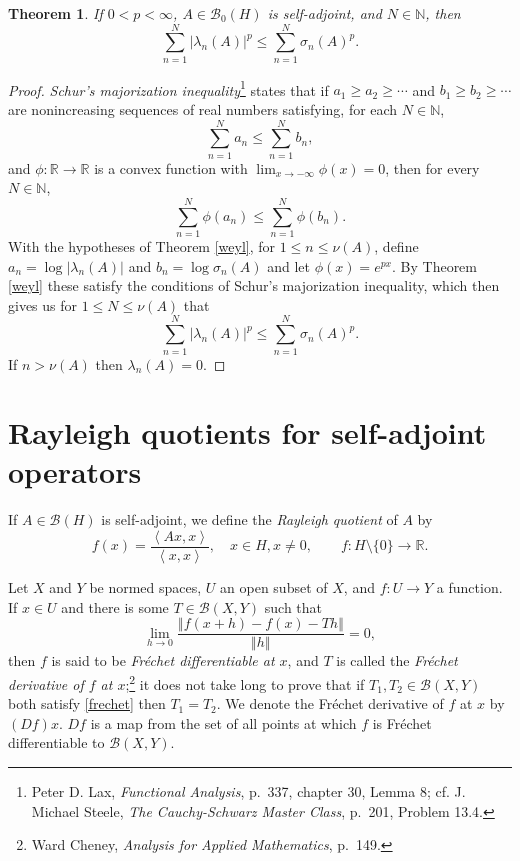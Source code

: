 \documentclass{article}
\newcommand{\inner}[2]{\left\langle #1, #2 \right\rangle}
\newcommand{\norm}[1]{\left\Vert #1 \right\Vert}
\newtheorem{theorem}{Theorem}
\theoremstyle{definition}
\begin{document}
\begin{theorem}
If $0<p<\infty$, $A \in \mathscr{B}_0(H)$ is self-adjoint, and $N \in \mathbb{N}$, then
\[
\sum_{n=1}^N |\lambda_n(A)|^p \leq \sum_{n=1}^N \sigma_n(A)^p.
\]
\end{theorem}
\begin{proof}
{\em Schur's majorization inequality}\footnote{Peter D. Lax,
{\em Functional Analysis}, p.~337, chapter 30, Lemma 8; cf. J. Michael Steele, {\em The Cauchy-Schwarz Master
Class}, p.~201, Problem 13.4.}
 states that if
 $a_1 \geq a_2 \geq \cdots$ and
$b_1 \geq b_2 \geq \cdots$ are nonincreasing sequences of real numbers satisfying, for each $N \in \mathbb{N}$,
\[
\sum_{n=1}^N a_n \leq \sum_{n=1}^N b_n,
\]
and $\phi:\mathbb{R} \to \mathbb{R}$ is a convex function with $\lim_{x \to -\infty} \phi(x)=0$, then for every $N \in \mathbb{N}$,
\[
\sum_{n=1}^N \phi(a_n) \leq \sum_{n=1}^N \phi(b_n).
\]
With the hypotheses of Theorem \ref{weyl}, for $1 \leq n \leq \nu(A)$, define
 $a_n = \log |\lambda_n(A)|$ and
$b_n = \log \sigma_n(A)$ and let $\phi(x)=e^{px}$. By Theorem \ref{weyl} these satisfy the conditions of Schur's majorization inequality,
which then gives us for $1 \leq N \leq \nu(A)$ that
\[
\sum_{n=1}^N |\lambda_n(A)|^p \leq \sum_{n=1}^N \sigma_n(A)^p.
\]
If $n>\nu(A)$ then $\lambda_n(A)=0$.
\end{proof}



\section{Rayleigh quotients for self-adjoint operators}
If $A \in \mathscr{B}(H)$ is self-adjoint, we define the {\em Rayleigh quotient} of $A$ by
\[
f(x)=\frac{\inner{Ax}{x}}{\inner{x}{x}}, \quad x \in H, x \neq 0, \qquad f:H \setminus \{0\} \to \mathbb{R}.
\]

Let $X$ and $Y$ be normed spaces, $U$ an open subset of $X$, and $f:U \to Y$ a function.
If $x \in U$ and there is some $T \in \mathscr{B}(X,Y)$ such that 
\begin{equation}
\lim_{h \to 0} \frac{\norm{f(x+h)-f(x)-Th}}{\norm{h}} = 0,
\label{frechet}
\end{equation}
then $f$ is said to be {\em Fr\'echet differentiable at $x$}, and $T$ is called the {\em Fr\'echet derivative of $f$ at $x$};\footnote{Ward
Cheney, {\em Analysis for Applied Mathematics}, p.~149.} it does not take long to prove that if $T_1,T_2 \in \mathscr{B}(X,Y)$ both satisfy
\eqref{frechet} then $T_1=T_2$. We denote the Fr\'echet derivative of $f$ at $x$ by $(Df)x$. $Df$ is a map from the set of all points at which
$f$ is Fr\'echet differentiable to $\mathscr{B}(X,Y)$.
\end{document}
